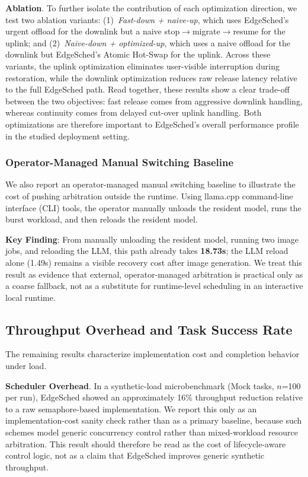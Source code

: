 \textbf{Ablation}. To further isolate the contribution of each optimization direction, we test two ablation variants: (1)~\emph{Fast-down + naive-up}, which uses EdgeSched's urgent offload for the downlink but a naive stop$\rightarrow$migrate$\rightarrow$resume for the uplink; and (2)~\emph{Naive-down + optimized-up}, which uses a naive offload for the downlink but EdgeSched's Atomic Hot-Swap for the uplink. Across these variants, the uplink optimization eliminates user-visible interruption during restoration, while the downlink optimization reduces raw release latency relative to the full EdgeSched path. Read together, these results show a clear trade-off between the two objectives: fast release comes from aggressive downlink handling, whereas continuity comes from delayed cut-over uplink handling. Both optimizations are therefore important to EdgeSched's overall performance profile in the studied deployment setting.

\subsubsection{Operator-Managed Manual Switching Baseline}

We also report an operator-managed manual switching baseline to illustrate the cost of pushing arbitration outside the runtime. Using llama.cpp command-line interface (CLI) tools, the operator manually unloads the resident model, runs the burst workload, and then reloads the resident model.

\textbf{Key Finding}: From manually unloading the resident model, running two image jobs, and reloading the LLM, this path already takes \textbf{18.73s}; the LLM reload alone (1.49s) remains a visible recovery cost after image generation. We treat this result as evidence that external, operator-managed arbitration is practical only as a coarse fallback, not as a substitute for runtime-level scheduling in an interactive local runtime.

\subsection{Throughput Overhead and Task Success Rate}

The remaining results characterize implementation cost and completion behavior under load.

\textbf{Scheduler Overhead}. In a synthetic-load microbenchmark (Mock tasks, $n$=100 per run), EdgeSched showed an approximately 16\% throughput reduction relative to a raw semaphore-based implementation. We report this only as an implementation-cost sanity check rather than as a primary baseline, because such schemes model generic concurrency control rather than mixed-workload resource arbitration. This result should therefore be read as the cost of lifecycle-aware control logic, not as a claim that EdgeSched improves generic synthetic throughput.

